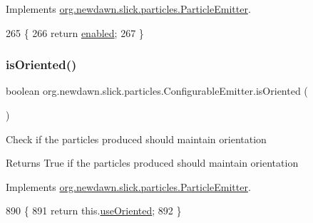 Implements \mbox{\hyperlink{interfaceorg_1_1newdawn_1_1slick_1_1particles_1_1_particle_emitter_a6a6fabad4971a0634a0a99dbed53c47d}{org.\+newdawn.\+slick.\+particles.\+Particle\+Emitter}}.


\begin{DoxyCode}
265                                \{
266         \textcolor{keywordflow}{return} \mbox{\hyperlink{classorg_1_1newdawn_1_1slick_1_1particles_1_1_configurable_emitter_a946084290596958350688f1e02b6e611}{enabled}};
267     \}
\end{DoxyCode}
\mbox{\label{classorg_1_1newdawn_1_1slick_1_1particles_1_1_configurable_emitter_a1435dc04f4e3a38ba5af82650ca3f9ea}} 
\subsubsection{\texorpdfstring{is\+Oriented()}{isOriented()}}
{\footnotesize\ttfamily boolean org.\+newdawn.\+slick.\+particles.\+Configurable\+Emitter.\+is\+Oriented (\begin{DoxyParamCaption}{ }\end{DoxyParamCaption})\hspace{0.3cm}{\ttfamily [inline]}}

Check if the particles produced should maintain orientation

\begin{DoxyReturn}{Returns}
True if the particles produced should maintain orientation 
\end{DoxyReturn}


Implements \mbox{\hyperlink{interfaceorg_1_1newdawn_1_1slick_1_1particles_1_1_particle_emitter_a4a51564b4539a1eb2c3fc0d322ac5c2a}{org.\+newdawn.\+slick.\+particles.\+Particle\+Emitter}}.


\begin{DoxyCode}
890                                 \{
891         \textcolor{keywordflow}{return} this.\mbox{\hyperlink{classorg_1_1newdawn_1_1slick_1_1particles_1_1_configurable_emitter_ab38e5cf019d342ffd95b3164ed209cac}{useOriented}};
892     \}
\end{DoxyCode}
\mbox{\label{classorg_1_1newdawn_1_1slick_1_1particles_1_1_configurable_emitter_a86bf563a92e8c12e4390f822e872c696}} 
